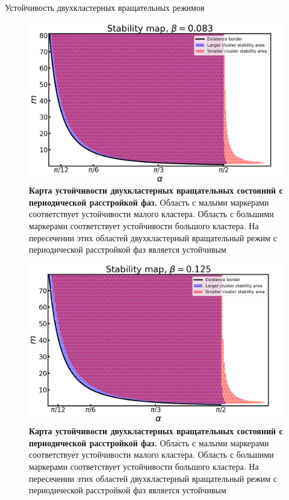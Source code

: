 \begin{chapter}{Устойчивость двухкластерных вращательных режимов}
	\begin{figure}[h!]\center
		
		\includegraphics[width=1\columnwidth]{pictures/map-0-083.png}
		\caption{\textbf{Карта устойчивости двухкластерных вращательных состояний с периодической расстройкой фаз.}
		Область с малыми маркерами соответствует устойчивости малого кластера.
		Область с большими маркерами соответствует устойчивости большого кластера.
		На пересечении этих областей двухкластерный вращательный режим с периодической расстройкой фаз является устойчивым}
		\label{map-083}
	\end{figure}


	\begin{figure}[h!]\center
		\includegraphics[width=1\columnwidth]{pictures/map-0-0125.png}
		\caption{\textbf{Карта устойчивости двухкластерных вращательных состояний с периодической расстройкой фаз.}
		Область с малыми маркерами соответствует устойчивости малого кластера.
		Область с большими маркерами соответствует устойчивости большого кластера.
		На пересечении этих областей двухкластерный вращательный режим с периодической расстройкой фаз является устойчивым}
		\label{map-0125}
	\end{figure}


\end{chapter}
